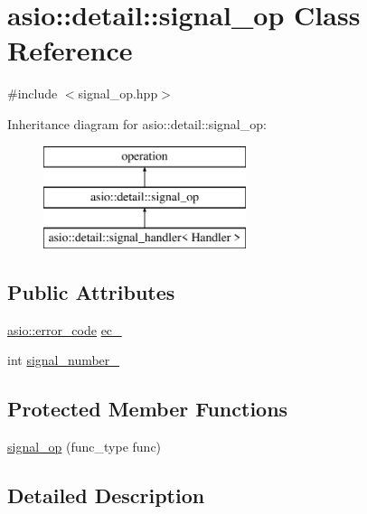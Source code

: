 \hypertarget{classasio_1_1detail_1_1signal__op}{}\section{asio\+:\+:detail\+:\+:signal\+\_\+op Class Reference}
\label{classasio_1_1detail_1_1signal__op}


{\ttfamily \#include $<$signal\+\_\+op.\+hpp$>$}

Inheritance diagram for asio\+:\+:detail\+:\+:signal\+\_\+op\+:\begin{figure}[H]
\begin{center}
\leavevmode
\includegraphics[height=3.000000cm]{classasio_1_1detail_1_1signal__op}
\end{center}
\end{figure}
\subsection*{Public Attributes}
\begin{DoxyCompactItemize}
\item 
\hyperlink{classasio_1_1error__code}{asio\+::error\+\_\+code} \hyperlink{classasio_1_1detail_1_1signal__op_a1eeb53c276a6a007cb74012a92fafeec}{ec\+\_\+}
\item 
int \hyperlink{classasio_1_1detail_1_1signal__op_a3ca07d986aeb62051c9c4af5104a2dff}{signal\+\_\+number\+\_\+}
\end{DoxyCompactItemize}
\subsection*{Protected Member Functions}
\begin{DoxyCompactItemize}
\item 
\hyperlink{classasio_1_1detail_1_1signal__op_a320d958f661b8bff2a4a9ed8165011c2}{signal\+\_\+op} (func\+\_\+type func)
\end{DoxyCompactItemize}


\subsection{Detailed Description}


